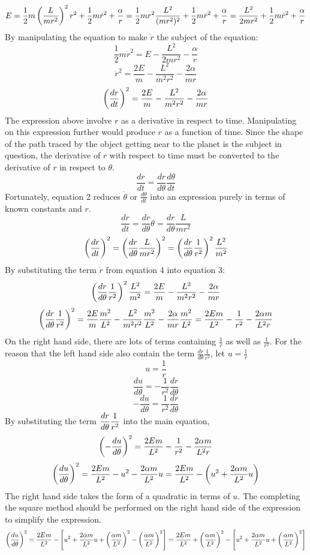 \documentclass[class=report, 12pt, crop=false]{standalone}
\begin{document}
\begin{center}
$$E = \frac{1}{2}m\left(\frac{L}{mr^2}\right)^2r^2 + \frac{1}{2}m\dot{r}^2 +\frac{\alpha}{r} = \frac{1}{2}mr^2\frac{L^2}{(mr^2)^2} + \frac{1}{2}m\dot{r}^2 +\frac{\alpha}{r} = \frac{L^2}{2mr^2} + \frac{1}{2}m\dot{r}^2 +\frac{\alpha}{r}$$
By manipulating the equation to make $\dot{r}$ the subject of the equation:
$$\frac{1}{2}m\dot{r}^2 = E - \frac{L^2}{2mr^2} - \frac{\alpha}{r}$$
$$\dot{r}^2 = \frac{2E}{m}-\frac{L^2}{m^2r^2}-\frac{2\alpha}{mr}$$
$$\left(\frac{dr}{dt}\right)^2 =\frac{2E}{m}-\frac{L^2}{m^2r^2}-\frac{2\alpha}{mr}$$
The expression above involve $r$ as a derivative in respect to time. Manipulating on this expression further would produce $r$ as a function of time. Since the shape of the path traced by the object getting near to the planet is the subject in question, the derivative of $r$ with respect to time must be converted to the derivative of $r$ in respect to $\theta$.
$$\frac{dr}{dt} = \frac{dr}{d\theta}\frac{d\theta}{dt}$$
Fortunately, equation 2 reduces $\dot{\theta}$ or $\frac{d\theta}{dt}$ into an expression purely in terms of known constants and $r$.
$$\frac{dr}{dt} = \frac{dr}{d\theta}\dot{\theta} = \frac{dr}{d\theta}\frac{L}{mr^2}$$
$$\left(\frac{dr}{dt}\right)^2 = \left(\frac{dr}{d\theta}\frac{L}{mr^2}\right)^2 = \left(\frac{dr}{d\theta}\frac{1}{r^2}\right)^2\frac{L^2}{m^2}$$
By substituting the term $\dot{r}$ from equation 4 into equation 3:
$$\left(\frac{dr}{d\theta}\frac{1}{r^2}\right)^2\frac{L^2}{m^2}=\frac{2E}{m}-\frac{L^2}{m^2r^2}-\frac{2\alpha}{mr}$$
$$\left(\frac{dr}{d\theta}\frac{1}{r^2}\right)^2 = \frac{2E}{m}\frac{m^2}{L^2}-\frac{L^2}{m^2r^2}\frac{m^2}{L^2}-\frac{2\alpha}{mr}\frac{m^2}{L^2} = \frac{2Em}{L^2}-\frac{1}{r^2}-\frac{2\alpha m}{L^2r}$$
On the right hand side, there are lots of terms containing $\displaystyle\frac{1}{r}$ as well as $\displaystyle\frac{1}{r^2}$. For the reason that the left hand side also contain the term $\displaystyle\frac{dr}{d\theta}\frac{1}{r^2}$, let $\displaystyle u = \frac{1}{r}$
$$u = \frac{1}{r}$$
$$\frac{du}{d\theta} = -\frac{1}{r^2}\frac{dr}{d\theta}$$
$$-\frac{du}{d\theta} = \frac{1}{r^2}\frac{dr}{d\theta}$$
By substituting the term $\displaystyle{\frac{dr}{d\theta}\frac{1}{r^2}}$ into the main equation,
$$\left(-\frac{du}{d\theta}\right)^2=\frac{2Em}{L^2}-\frac{1}{r^2}-\frac{2\alpha m}{L^2r}$$
$$\left(\frac{du}{d\theta}\right)^2=\frac{2Em}{L^2}-u^2-\frac{2\alpha m}{L^2}u = \frac{2Em}{L^2}-\left(u^2+\frac{2\alpha m}{L^2}u\right)$$
The right hand side takes the form of a quadratic in terms of $u$. The completing the square method should be performed on the right hand side of the expression to simplify the expression.
$$\left(\frac{du}{d\theta}\right)^2=\frac{2Em}{L^2}-\left[u^2+\frac{2\alpha m}{L^2}u + \left(\frac{\alpha m}{L^2}\right)^2 - \left(\frac{\alpha m}{L^2}\right)^2\right] = \frac{2Em}{L^2}+ \left(\frac{\alpha m}{L^2}\right)^2-\left[u^2+\frac{2\alpha m}{L^2}u + \left(\frac{\alpha m}{L^2}\right)^2\right]$$

\end{center}
\end{document}
